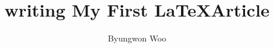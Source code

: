\documentclass[12pt]{article}
\begin{document}
\title{writing My First \LaTeX Article}
\author{Byungwon Woo}
\end{document}
